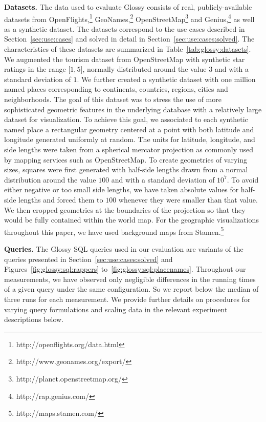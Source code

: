 \documentclass[11pt, oneside]{report}
\newcommand{\minisec}[1]{\noindent\textbf{#1.}}
\begin{document}
{\minisec{Datasets}
The data used to evaluate Glossy consists of real, publicly-available datasets from OpenFlights,\footnote{http://openflights.org/data.html} GeoNames,\footnote{http://www.geonames.org/export/} OpenStreetMap\footnote{http://planet.openstreetmap.org/} and Genius,\footnote{http://rap.genius.com/} as well as a synthetic dataset. The datasets correspond to the use cases described in Section~\ref{sec:use:cases} and solved in detail in Section~\ref{sec:use:cases:solved}. The characteristics of these datasets are summarized in Table~\ref{tab:glossy:datasets}. We augmented the tourism dataset from OpenStreetMap with synthetic star ratings in the range $\lbrack 1, 5 \rbrack$, normally distributed around the value $3$ and with a standard deviation of $1$.  We further created a synthetic dataset with one million named places corresponding to continents, countries, regions, cities and neighborhoods. The goal of this dataset was to stress the use of more sophisticated geometric features in the underlying database with a relatively large dataset for visualization. To achieve this goal, we associated to each synthetic named place a rectangular geometry centered at a point with both latitude and longitude generated uniformly at random. The units for latitude, longitude, and side lengths were taken from a spherical mercator projection as commonly used by mapping services such as OpenStreetMap. To create geometries of varying sizes, squares were first generated with half-side lengths drawn from a normal distribution around the value $100$ and with a standard deviation of $10^7$. To avoid either negative or too small side lengths, we have taken absolute values for half-side lengths and forced them to $100$ whenever they were smaller than that value. We then cropped geometries at the boundaries of the projection so that they would be fully contained within the world map. For the geographic visualizations throughout this paper, we have used background maps from Stamen.\footnote{http://maps.stamen.com/}

\minisec{Queries}
The Glossy SQL queries used in our evaluation are variants of the queries presented in Section~\ref{sec:use:cases:solved} and Figures~\ref{fig:glossy:sql:rappers} to~\ref{fig:glossy:sql:placenames}. Throughout our measurements, we have observed only negligible differences in the running times of a given query under the same configuration. So we report below the median of three runs for each measurement. We provide further details on procedures for varying query formulations and scaling data in the relevant experiment descriptions below.  

}
\end{document}
